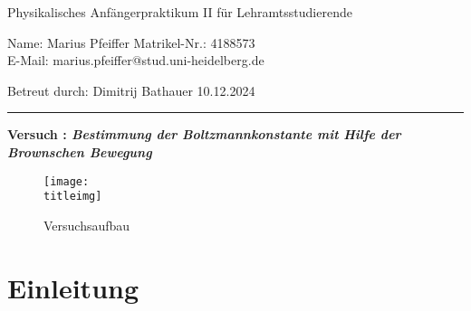 \documentclass[a4paper,12pt]{article}
\newcounter{versuchnr}
\begin{document}
	
	\newcommand{\name}{Marius Pfeiffer}

	\setcounter{versuchnr}{223}
	\newcommand{\versuchtitel}{Bestimmung der Boltzmannkonstante mit Hilfe der Brownschen Bewegung}
	\newcommand{\protocolpdf}{files/223messprotokoll.pdf}
	\newcommand{\titleimg}{files/versuchsaufbau.png}
	\newcommand{\betreuer}{Dimitrij Bathauer}
	\newcommand{\datum}{10.12.2024}
	
	
	\begin{center}
		{Physikalisches Anfängerpraktikum II für Lehramtsstudierende}\\[3mm]
	\end{center}
	
	\vspace*{5mm}
	
	\noindent Name: \name{}
	\hfill Matrikel-Nr.: 4188573\\
	E-Mail: marius.pfeiffer@stud.uni-heidelberg.de
	
	\vspace*{2mm}
	\noindent Betreut durch: \betreuer
    \hfill \datum

	\vspace*{2mm}
	\hrule \vspace*{10mm}

  \begin{center}
    {\bf \large Versuch : \it \bf \versuchtitel}
  \end{center}

  \vspace*{10mm}

  \begin{figure}[H]
    \centering
    \texttt{[image: \\titleimg]}
    \caption{Versuchsaufbau}
  \end{figure}

  \tableofcontents
  \newpage\noindent
	
	\section{Einleitung}
	
	
	
	
  
	
	
	\newpage\noindent
	
	
	
	
	\newpage\noindent
	
	
	
\end{document}
